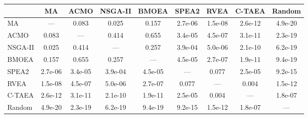 \begin{tabular}{@{}lcccccccc@{}}
\toprule
 & MA & ACMO & NSGA-II & BMOEA & SPEA2 & RVEA & C-TAEA & Random \\
\midrule
MA & --- & 0.083 & 0.025 & 0.157 & 2.7e-06 & 1.5e-08 & 2.6e-12 & 4.9e-20 \\
ACMO & 0.083 & --- & 0.414 & 0.655 & 3.4e-05 & 4.5e-07 & 3.1e-11 & 2.3e-19 \\
NSGA-II & 0.025 & 0.414 & --- & 0.257 & 3.9e-04 & 5.0e-06 & 2.1e-10 & 6.2e-19 \\
BMOEA & 0.157 & 0.655 & 0.257 & --- & 4.5e-05 & 2.7e-07 & 1.9e-11 & 9.4e-19 \\
SPEA2 & 2.7e-06 & 3.4e-05 & 3.9e-04 & 4.5e-05 & --- & 0.077 & 2.5e-05 & 9.2e-15 \\
RVEA & 1.5e-08 & 4.5e-07 & 5.0e-06 & 2.7e-07 & 0.077 & --- & 0.004 & 1.5e-12 \\
C-TAEA & 2.6e-12 & 3.1e-11 & 2.1e-10 & 1.9e-11 & 2.5e-05 & 0.004 & --- & 1.8e-07 \\
Random & 4.9e-20 & 2.3e-19 & 6.2e-19 & 9.4e-19 & 9.2e-15 & 1.5e-12 & 1.8e-07 & --- \\
\bottomrule
\end{tabular}